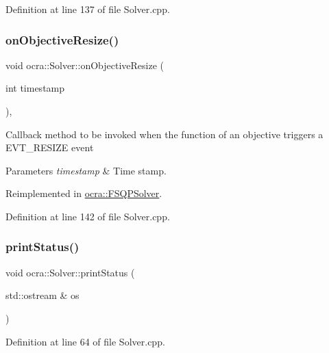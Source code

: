 Definition at line 137 of file Solver.\+cpp.

\hypertarget{classocra_1_1Solver_a7d45f67599edfa5ba8373b115378de5c}{}\label{classocra_1_1Solver_a7d45f67599edfa5ba8373b115378de5c} 
\subsubsection{\texorpdfstring{on\+Objective\+Resize()}{onObjectiveResize()}}
{\footnotesize\ttfamily void ocra\+::\+Solver\+::on\+Objective\+Resize (\begin{DoxyParamCaption}\item[{int}]{timestamp }\end{DoxyParamCaption})\hspace{0.3cm}{\ttfamily [protected]}, {\ttfamily [virtual]}}

Callback method to be invoked when the function of an objective triggers a E\+V\+T\+\_\+\+R\+E\+S\+I\+ZE event


\begin{DoxyParams}{Parameters}
{\em timestamp} & Time stamp. \\
\hline
\end{DoxyParams}


Reimplemented in \hyperlink{classocra_1_1FSQPSolver_a87f59b841b1101fd552f7f9de3d3d99d}{ocra\+::\+F\+S\+Q\+P\+Solver}.



Definition at line 142 of file Solver.\+cpp.

\hypertarget{classocra_1_1Solver_a6126d57ab3704acaec99525087ced070}{}\label{classocra_1_1Solver_a6126d57ab3704acaec99525087ced070} 
\subsubsection{\texorpdfstring{print\+Status()}{printStatus()}}
{\footnotesize\ttfamily void ocra\+::\+Solver\+::print\+Status (\begin{DoxyParamCaption}\item[{std\+::ostream \&}]{os }\end{DoxyParamCaption})}



Definition at line 64 of file Solver.\+cpp.

